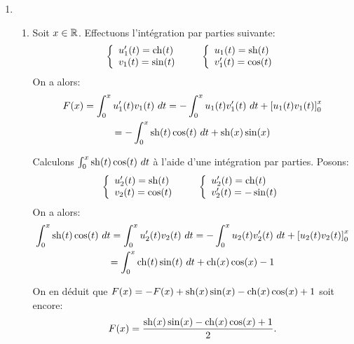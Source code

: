 \begin{enumerate}
  \item 
\begin{enumerate}
  \item Soit $x\in \mathbb{R}$. Effectuons l'intégration par parties suivante:
$$\left \{ \begin{array}{ll}
            u_{1}'(t) = \operatorname{ch} (t)\\
            v_{1}(t) = \sin (t)
           \end{array}
  \right. \qquad \left \{ \begin{array}{ll}
                          u_{1}(t) = \operatorname{sh} (t)\\
                           v_{1}'(t) = \cos (t)
                          \end{array}
                  \right.$$
On a alors:
\begin{multline*}
 F(x) = \int_{0}^{x}u_{1}'(t)v_{1}(t)\ dt 
  = -\int_{0}^{x}u_{1}(t)v_{1}'(t)\ dt + \left [u_{1}(t)v_{1}(t)\right ]_{0}^{x} \\
  = -\int_{0}^{x}\operatorname{sh} (t)\cos (t)\ dt + \operatorname{sh} (x)\sin (x)
\end{multline*}

Calculons $\int_{0}^{x}\sh (t)\cos (t)\ dt$ à l'aide d'une intégration par parties. Posons:
$$\left \{ \begin{array}{ll}
            u_{2}'(t) = \operatorname{sh} (t)\\
            v_{2}(t) = \cos (t)
           \end{array}
  \right. \qquad \left \{ \begin{array}{ll}
                           u_{2}'(t) = \operatorname{ch} (t)\\
                           v_{2}'(t) = -\sin (t)
                          \end{array}
                 \right.$$
On a alors:
\begin{multline*}
 \int_{0}^{x}\operatorname{sh} (t)\cos (t)\ dt  = \int_{0}^{x}u_{2}'(t)v_{2}(t)\ dt
  = -\int_{0}^{x}u_{2}(t)v_{2}'(t)\ dt + \left [ u_{2}(t)v_{2}(t)\right ]_{0}^{x} \\
  = \int_{0}^{x}\operatorname{ch} (t)\sin (t)\ dt + \operatorname{ch} (x)\cos (x) - 1
\end{multline*}

On en déduit que $F(x) = -F(x) +\operatorname{sh} (x)\sin (x) - \operatorname{ch} (x)\cos (x) +1$ soit encore:
$$F(x) = \frac{\operatorname{sh} (x)\sin (x) - \operatorname{ch} (x)\cos (x) +1}{2}.$$


\end{enumerate}
\end{enumerate}
